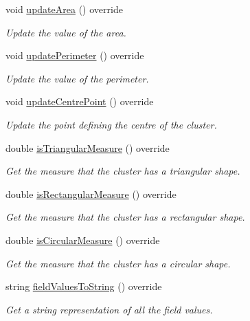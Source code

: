 \begin{DoxyCompactItemize}
void \hyperlink{classmultiscale_1_1analysis_1_1Cluster_a3128a3b20c28619ccdd6a25208b8c83e}{update\-Area} () override
\begin{DoxyCompactList}\small\item\em Update the value of the area. \end{DoxyCompactList}\item 
void \hyperlink{classmultiscale_1_1analysis_1_1Cluster_aadc520e4459f1ea6e22afd7c02d5f2ed}{update\-Perimeter} () override
\begin{DoxyCompactList}\small\item\em Update the value of the perimeter. \end{DoxyCompactList}\item 
void \hyperlink{classmultiscale_1_1analysis_1_1Cluster_a1991d68cc9e76dab54c134df6beb59cb}{update\-Centre\-Point} () override
\begin{DoxyCompactList}\small\item\em Update the point defining the centre of the cluster. \end{DoxyCompactList}\item 
double \hyperlink{classmultiscale_1_1analysis_1_1Cluster_a28efcf050af76acb01619b36505b662e}{is\-Triangular\-Measure} () override
\begin{DoxyCompactList}\small\item\em Get the measure that the cluster has a triangular shape. \end{DoxyCompactList}\item 
double \hyperlink{classmultiscale_1_1analysis_1_1Cluster_aca93cb46704a3e824151e99b7a53d20d}{is\-Rectangular\-Measure} () override
\begin{DoxyCompactList}\small\item\em Get the measure that the cluster has a rectangular shape. \end{DoxyCompactList}\item 
double \hyperlink{classmultiscale_1_1analysis_1_1Cluster_a579730478055ae93d659f268375a492d}{is\-Circular\-Measure} () override
\begin{DoxyCompactList}\small\item\em Get the measure that the cluster has a circular shape. \end{DoxyCompactList}\item 
string \hyperlink{classmultiscale_1_1analysis_1_1Cluster_ac231dc426e9e2f1767660192de859aad}{field\-Values\-To\-String} () override
\begin{DoxyCompactList}\small\item\em Get a string representation of all the field values. \end{DoxyCompactList}\item 

\end{DoxyCompactItemize}
